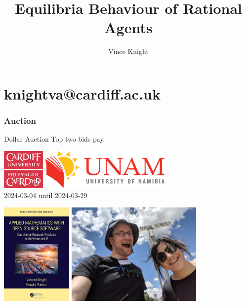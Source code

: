 \documentclass{beamer}              %
\title{Equilibria Behaviour of Rational Agents}
\author{Vince Knight}
\date{}
\begin{document}
\frame{
    \titlepage
}

\section{knightva@cardiff.ac.uk}

\begin{frame}
    \frametitle{Auction}
        \begin{alertblock}{Dollar Auction}
            \centering
                Top two bids pay.
        \end{alertblock}
\end{frame}

\begin{frame}
    \centering

    \includegraphics[height=2cm]{static/CUident_CMYK.png}
    \hfill
    \includegraphics[height=2cm]{static/Logo_UNAM_Namibia.png}\\
    \tiny{2024-03-04 until 2024-03-29}

\end{frame}

\begin{frame}
    \centering

    \includegraphics[height=5cm]{static/book.jpg}
    \hfill
    \includegraphics[height=5cm]{static/nash-street.jpg}
\end{frame}
\end{document}
